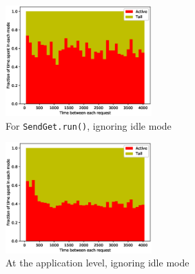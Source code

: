 \begin{figure}
  \includegraphics[width=0.5\textwidth]{figures/google_method_2states.eps}
  \caption{For \texttt{SendGet.run()}, ignoring idle mode}
  \label{fig:ggl:2:meth}
\vspace {-0.32in}
\end{figure}

\begin{figure}
  \includegraphics[width=0.5\textwidth]{figures/google_global_2states.eps}
  \caption{At the application level, ignoring idle mode}
  \label{fig:ggl:2:glob}
\vspace {-0.32in}
\end{figure}
